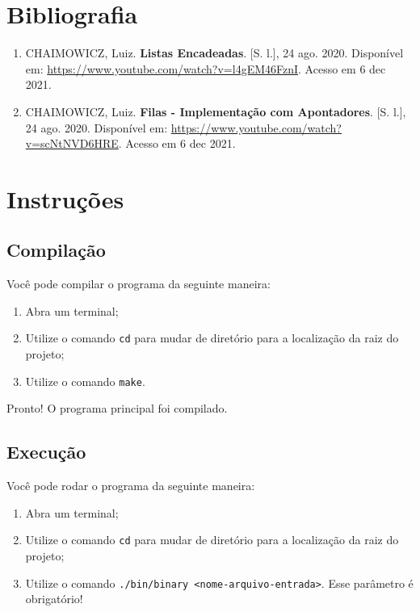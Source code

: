 \documentclass{article}
\def\code#1{\texttt{#1}}
\begin{document}

\section{Bibliografia}

\begin{enumerate}

    \item CHAIMOWICZ, Luiz. \textbf{Listas Encadeadas}. [S. l.], 24 ago. 2020. Disponível em: \url{https://www.youtube.com/watch?v=l4gEM46FznI}. Acesso em 6 dec 2021.

    \item CHAIMOWICZ, Luiz. \textbf{Filas - Implementação com Apontadores}. [S. l.], 24 ago. 2020. Disponível em: \url{https://www.youtube.com/watch?v=scNtNVD6HRE}. Acesso em 6 dec 2021.

\end{enumerate}


\newpage
\section*{Instruções}

\subsection*{Compilação}

Você pode compilar o programa da seguinte maneira:

\begin{enumerate}
    \item Abra um terminal;
    \item Utilize o comando \code{cd} para mudar de diretório para a localização da raiz do projeto;
    \item Utilize o comando \code{make}. 
\end{enumerate}

Pronto! O programa principal foi compilado. 

\subsection*{Execução}

Você pode rodar o programa da seguinte maneira:

\begin{enumerate}
    \item Abra um terminal;
    \item Utilize o comando \code{cd} para mudar de diretório para a localização da raiz do projeto;
    \item Utilize o comando \code{./bin/binary <nome-arquivo-entrada>}. Esse parâmetro é obrigatório!
\end{enumerate}
\end{document}
